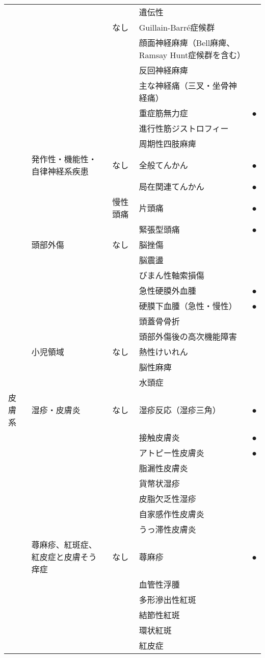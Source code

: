 \begin{xltabular}{\linewidth}{XXXXX}
 &  &  & 遺伝性 &  \\
 &  & なし & Guillain-Barré症候群 &  \\
 &  &  & 顔面神経麻痺（Bell麻痺、Ramsay Hunt症候群を含む） &  \\
 &  &  & 反回神経麻痺 &  \\
 &  &  & 主な神経痛（三叉・坐骨神経痛） &  \\
 &  &  & 重症筋無力症 & ● \\
 &  &  & 進行性筋ジストロフィー &  \\
 &  &  & 周期性四肢麻痺 &  \\
 & 発作性・機能性・自律神経系疾患 & なし & 全般てんかん & ● \\
 &  &  & 局在関連てんかん & ● \\
 &  & 慢性頭痛 & 片頭痛 & ● \\
 &  &  & 緊張型頭痛 & ● \\
 & 頭部外傷 & なし & 脳挫傷 &  \\
 &  &  & 脳震盪 &  \\
 &  &  & びまん性軸索損傷 &  \\
 &  &  & 急性硬膜外血腫 & ● \\
 &  &  & 硬膜下血腫（急性・慢性） & ● \\
 &  &  & 頭蓋骨骨折 &  \\
 &  &  & 頭部外傷後の高次機能障害 &  \\
 & 小児領域 & なし & 熱性けいれん &  \\
 &  &  & 脳性麻痺 &  \\
 &  &  & 水頭症 &  \\
皮膚系 & 湿疹・皮膚炎 & なし & 湿疹反応（湿疹三角） & ● \\
 &  &  & 接触皮膚炎 & ● \\
 &  &  & アトピー性皮膚炎 & ● \\
 &  &  & 脂漏性皮膚炎 &  \\
 &  &  & 貨幣状湿疹 &  \\
 &  &  & 皮脂欠乏性湿疹 &  \\
 &  &  & 自家感作性皮膚炎 &  \\
 &  &  & うっ滞性皮膚炎 &  \\
 & 蕁麻疹、紅斑症、紅皮症と皮膚そう痒症 & なし & 蕁麻疹 & ● \\
 &  &  & 血管性浮腫 &  \\
 &  &  & 多形滲出性紅斑 &  \\
 &  &  & 結節性紅斑 &  \\
 &  &  & 環状紅斑 &  \\
 &  &  & 紅皮症 &  \\

\end{xltabular}

